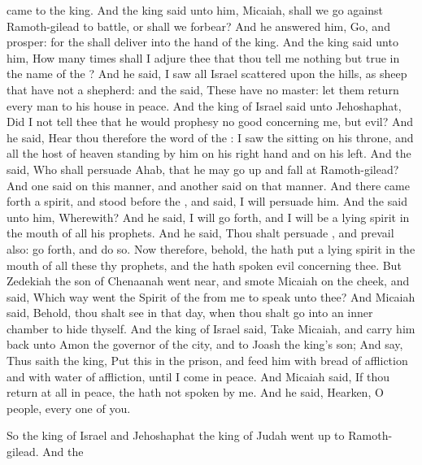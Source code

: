 {came to the
king. And the
king
said unto him,
Micaiah, shall we
go against
Ramoth-gilead to
battle, or shall we
forbear? And he
answered him,
Go, and
prosper: for the
{} shall
deliver
{} into the
hand of the
king.
And the
king
said unto him, How many
times shall I
adjure thee that thou
tell me nothing but
{}
true in the
name of the
{}?
And he
said, I
saw all
Israel
scattered upon the
hills, as
sheep that have not a
shepherd: and the
{}
said, These have no
master: let them
return every
man to his
house in
peace.
And the
king of
Israel
said unto
Jehoshaphat, Did I not
tell thee that he would
prophesy no
good concerning me, but
evil?
And he
said,
Hear thou therefore the
word of the
{}: I
saw the
{}
sitting on his
throne, and all the
host of
heaven
standing by him on his right
hand and on his
left.
And the
{}
said, Who shall
persuade
Ahab, that he may go
up and
fall at
Ramoth-gilead? And one
said on this
manner, and another
said on that
manner.
And there came
forth a
spirit, and
stood
before the
{}, and
said, I will
persuade him.
And the
{}
said unto him, Wherewith? And he
said, I will go
forth, and I will be a
lying
spirit in the
mouth of all his
prophets. And he
said, Thou shalt
persuade
{}, and
prevail also: go
forth, and
do so.
Now therefore, behold, the
{} hath
put a
lying
spirit in the
mouth of all these thy
prophets, and the
{} hath
spoken
evil concerning thee.
But
Zedekiah the
son of
Chenaanah went
near, and
smote
Micaiah on the
cheek, and
said, Which
way
went the
Spirit of the
{} from me to
speak unto thee?
And
Micaiah
said, Behold, thou shalt
see in that
day, when thou shalt
go into an
inner
chamber to
hide thyself.
And the
king of
Israel
said,
Take
Micaiah, and carry him
back unto
Amon the
governor of the
city, and to
Joash the
king’s
son;
And
say, Thus
saith the
king,
Put this
{} in the
prison, and
feed him with
bread of
affliction and with
water of
affliction, until I
come in
peace.
And
Micaiah
said, If thou
return at
all in
peace, the
{} hath not
spoken by me. And he
said,
Hearken, O
people, every one of you.
\par }{\PP {}So the
king of
Israel and
Jehoshaphat the
king of
Judah went
up to
Ramoth-gilead.
And the
}
